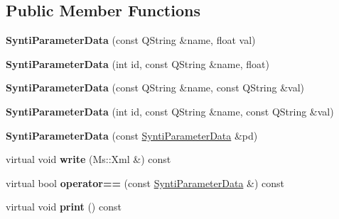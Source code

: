 \subsection*{Public Member Functions}
\begin{DoxyCompactItemize}
\item 
\mbox{\label{class_synti_parameter_data_af3165b90a79ab827545bd2c8d69ead83}} 
{\bfseries Synti\+Parameter\+Data} (const Q\+String \&name, float val)
\item 
\mbox{\label{class_synti_parameter_data_a622dc5964b34ff73dd39a4c5715f2e50}} 
{\bfseries Synti\+Parameter\+Data} (int id, const Q\+String \&name, float)
\item 
\mbox{\label{class_synti_parameter_data_a6810cf5f4eb767c1aeb1d526df8b7390}} 
{\bfseries Synti\+Parameter\+Data} (const Q\+String \&name, const Q\+String \&val)
\item 
\mbox{\label{class_synti_parameter_data_af9818c071c40bb36587e63752fe24a0c}} 
{\bfseries Synti\+Parameter\+Data} (int id, const Q\+String \&name, const Q\+String \&val)
\item 
\mbox{\label{class_synti_parameter_data_a2e81b963b7fbe8e0e2ec4bf5dd1f2bee}} 
{\bfseries Synti\+Parameter\+Data} (const \hyperlink{class_synti_parameter_data}{Synti\+Parameter\+Data} \&pd)
\item 
\mbox{\label{class_synti_parameter_data_a876a62c00b34f739f414aef214c7499e}} 
virtual void {\bfseries write} (Ms\+::\+Xml \&) const
\item 
\mbox{\label{class_synti_parameter_data_a6cb643ad0d94b81e7d8131c6e198ff32}} 
virtual bool {\bfseries operator==} (const \hyperlink{class_synti_parameter_data}{Synti\+Parameter\+Data} \&) const
\item 
\mbox{\label{class_synti_parameter_data_aa3d1756d1011a2f9ae44612a45df9c96}} 
virtual void {\bfseries print} () const
\end{DoxyCompactItemize}
